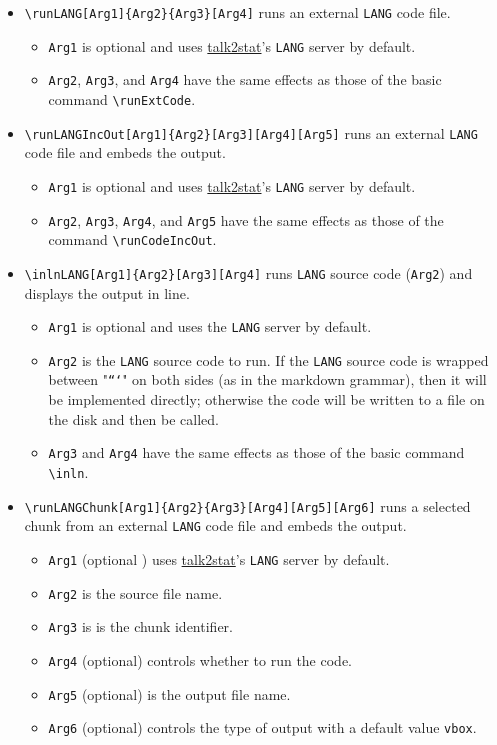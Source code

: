 \documentclass{ltxdoc}
\begin{document}
\begin{itemize}
\item \texttt{\textbackslash{}runLANG[Arg1]\{Arg2\}\{Arg3\}[Arg4]} runs an external \texttt{LANG} code file.
\begin{itemize}
\item \texttt{Arg1} is optional and uses \href{https://pypi.org/project/talk2stat/}{talk2stat}'s \texttt{LANG} server by default.
\item \texttt{Arg2}, \texttt{Arg3}, and \texttt{Arg4} have the same effects as those of the basic command
\texttt{\textbackslash{}runExtCode}.
\end{itemize}
\item \texttt{\textbackslash{}runLANGIncOut[Arg1]\{Arg2\}[Arg3][Arg4][Arg5]} runs an external \texttt{LANG} code
file and embeds the output.
\begin{itemize}
\item \texttt{Arg1} is optional and uses \href{https://pypi.org/project/talk2stat/}{talk2stat}'s \texttt{LANG} server by default.
\item \texttt{Arg2}, \texttt{Arg3}, \texttt{Arg4}, and \texttt{Arg5} have the same effects as those of the command
\texttt{\textbackslash{}runCodeIncOut}.
\end{itemize}
\item \texttt{\textbackslash{}inlnLANG[Arg1]\{Arg2\}[Arg3][Arg4]} runs \texttt{LANG} source code (\texttt{Arg2}) and displays
the output in line.
\begin{itemize}
\item \texttt{Arg1} is optional and uses the \texttt{LANG} server by default.
\item \texttt{Arg2} is the \texttt{LANG} source code to run. If the \texttt{LANG} source code is wrapped
between "\texttt{```}" on both sides (as in the markdown grammar), then it will be
implemented directly; otherwise the code will be written to a file on the
disk and then be called.
\item \texttt{Arg3} and \texttt{Arg4} have the same effects as those of the basic command \texttt{\textbackslash{}inln}.
\end{itemize}

\item \texttt{\textbackslash{}runLANGChunk[Arg1]\{Arg2\}\{Arg3\}[Arg4][Arg5][Arg6]} runs a selected chunk from
an external \texttt{LANG} code file and embeds the output. 
\begin{itemize}
\item \texttt{Arg1} (optional ) uses \href{https://pypi.org/project/talk2stat/}{talk2stat}'s \texttt{LANG} server by default.
\item \texttt{Arg2} is the source file name.
\item \texttt{Arg3} is is the chunk identifier.
\item \texttt{Arg4} (optional) controls whether to run the code.
\item \texttt{Arg5} (optional) is the output file name.
\item \texttt{Arg6} (optional) controls the type of output with a default value \texttt{vbox}.
\end{itemize}
\end{itemize}
\end{document}
